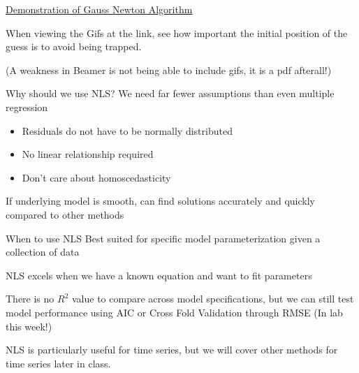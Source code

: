 \documentclass[
  ignorenonframetext,
]{beamer}
\begin{document}
\begin{frame}
\href{https://www1.hft-leipzig.de/strutz/Animations/op.html}{Demonstration
of Gauss Newton Algorithm}

When viewing the Gifs at the link, see how important the initial
position of the guess is to avoid being trapped.

\footnotesize

(A weakness in Beamer is not being able to include gifs, it is a pdf
afterall!)
\end{frame}

\begin{frame}{Why should we use NLS?}
\protect\hypertarget{why-should-we-use-nls}{}
We need far fewer assumptions than even multiple regression

\begin{itemize}
\item
  Residuals do not have to be normally distributed
\item
  No linear relationship required
\item
  Don't care about homoscedasticity
\end{itemize}

If underlying model is smooth, can find solutions accurately and quickly
compared to other methods
\end{frame}

\begin{frame}{When to use NLS}
\protect\hypertarget{when-to-use-nls}{}
Best suited for specific model parameterization given a collection of
data

NLS excels when we have a known equation and want to fit parameters

There is no \(R^2\) value to compare across model specifications, but we
can still test model performance using AIC or Cross Fold Validation
through RMSE (In lab this week!)

NLS is particularly useful for time series, but we will cover other
methods for time series later in class.
\end{frame}
\end{document}
